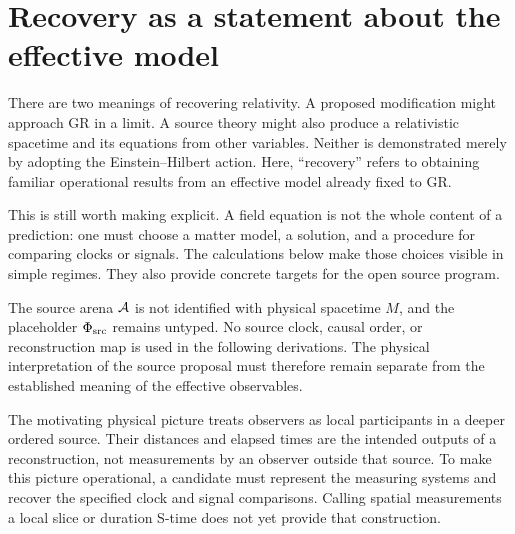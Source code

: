 \documentclass[11pt]{article}
\begin{document}

\section{Recovery as a statement about the effective model}
There are two meanings of recovering relativity. A proposed modification might approach GR in a limit. A source theory might also produce a relativistic spacetime and its equations from other variables. Neither is demonstrated merely by adopting the Einstein--Hilbert action. Here, ``recovery'' refers to obtaining familiar operational results from an effective model already fixed to GR.

This is still worth making explicit. A field equation is not the whole content of a prediction: one must choose a matter model, a solution, and a procedure for comparing clocks or signals. The calculations below make those choices visible in simple regimes. They also provide concrete targets for the open source program.

The source arena $\mathcal A$ is not identified with physical spacetime $M$, and the placeholder $\Phi_{\mathrm{src}}$ remains untyped. No source clock, causal order, or reconstruction map is used in the following derivations. The physical interpretation of the source proposal must therefore remain separate from the established meaning of the effective observables.

The motivating physical picture treats observers as local participants in a deeper ordered source. Their distances and elapsed times are the intended outputs of a reconstruction, not measurements by an observer outside that source. To make this picture operational, a candidate must represent the measuring systems and recover the specified clock and signal comparisons. Calling spatial measurements a local slice or duration S-time does not yet provide that construction.
\end{document}

